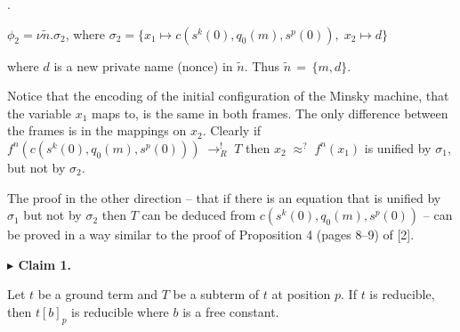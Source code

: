  
 
\par{}. 
 
$\phi_{2}=\nu\tilde{n}.\sigma_{2}$, where $\sigma_{2}=\{x_{1}\mapsto c(s^{k}(0),q_{0}(m),s^{p}(0)),\;x_{2}\mapsto d\}$\par
 
 
  
where $d$ is a new private name (nonce) in $\tilde{n}$. Thus $\tilde{n}\,=\,\{m,d\}$.\par
 
 
 
Notice that the encoding of the initial configuration of the Minsky machine, that the variable $x_{1}$ maps to, is the same in both frames. The only difference between the frames is in the mappings on $x_{2}$. Clearly if $f^{n}(c(s^{k}(0),q_{0}(m),s^{p}(0)))\;\rightarrow_{R}^{!}\;T$ then $x_{2}\;\approx^{?}\;f^{n}(x_{1})$ is unified by $\sigma_{1}$, but not by $\sigma_{2}$.\par
 
 
 
The proof in the other direction – that if there is an equation that is unified by $\sigma_{1}$ but not by $\sigma_{2}$ then $T$ can be deduced from $c(s^{k}(0),q_{0}(m),s^{p}(0))$ – can be proved in a way similar to the proof of Proposition 4 (pages 8–9) of [2].\par
 
 
 
\par\medskip\noindent\textbf{$\blacktriangleright$ Claim 1.}\par
 
 
Let $t$ be a ground term and $T$ be a subterm of $t$ at position $p$. If $t$ is reducible, then $t[b]_{p}$ is reducible where $b$ is a free constant.\par
 
 
 
 
 
